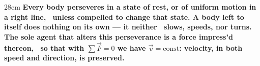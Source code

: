 \documentclass[border=4pt]{standalone}
\begin{document}
\begin{varwidth}{28em}
\large\bfseries
Every body perseveres in a state of rest, or of uniform motion in a right line, \     unless compelled to change that state. A body left to itself does nothing on its own — it neither \     slows, speeds, nor turns. The sole agent that alters this perseverance is a force impress'd thereon, \     so that with $\sum \vec{F} = 0$ we have $\vec{v} = \text{const}$: velocity, in both speed and direction, is preserved.
\end{varwidth}
\end{document}

